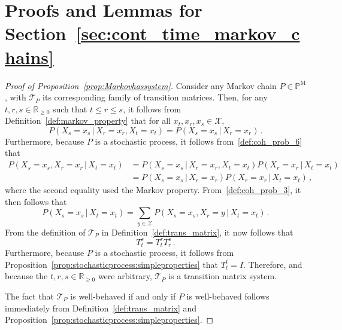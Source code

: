 \documentclass[10pt]{paper}
\theoremstyle{definition}
\newcommand{\reals}{\mathbb{R}}
\newcommand{\realsnonneg}{\reals_{\geq 0}}
\newcommand{\states}{\mathcal{X}}
\newcommand{\processes}{\mathbb{P}}
\newcommand{\mprocesses}{\processes^{\mathrm{M}}}
\begin{document}
\section{Proofs and Lemmas for Section~\ref{sec:cont_time_markov_chains}}

\begin{proof}[Proof of Proposition~\ref{prop:Markovhassystem}]
Consider any Markov chain $P\in\mprocesses$, with $\mathcal{T}_P$ its corresponding family of transition matrices. Then, for any $t,r,s\in\realsnonneg$ such that $t\leq r\leq s$, it follows from Definition~\ref{def:markov_property} that for all $x_t,x_r,x_s\in\states$,
\begin{equation*}
P(X_s=x_s\,\vert\,X_r=x_r,X_t=x_t) = P(X_s=x_s\,\vert\,X_r=x_r)\,.
\end{equation*}
Furthermore, because $P$ is a stochastic process, it follows from~\ref{def:coh_prob_6} that
\begin{align*}
P(X_s=x_s,X_r=x_r\,\vert\,X_t=x_t) &= P(X_s=x_s\,\vert\,X_r=x_r,X_t=x_t)P(X_r=x_r\,\vert\,X_t=x_t) \\
 &= P(X_s=x_s\,\vert\,X_r=x_r)P(X_r=x_r\,\vert\,X_t=x_t)\,,
\end{align*}
where the second equality used the Markov property. From~\ref{def:coh_prob_3}, it then follows that
\begin{equation*}
P(X_s=x_s\,\vert\,X_t=x_t) = \sum_{y\in\states} P(X_s=x_s,X_r=y\,\vert\,X_t=x_t)\,.
\end{equation*}
From the definition of $\mathcal{T}_P$ in Definition~\ref{def:trans_matrix}, it now follows that
\begin{equation*}
T_t^s = T_t^rT_r^s\,.
\end{equation*}
Furthermore, because $P$ is a stochastic process, it follows from Proposition~\ref{prop:stochasticprocess:simpleproperties} that $T_t^t=I$. Therefore, and because the $t,r,s\in\realsnonneg$ were arbitrary, $\mathcal{T}_P$ is a transition matrix system.

The fact that $\mathcal{T}_P$ is well-behaved if and only if $P$ is well-behaved follows immediately from Definition~\ref{def:trans_matrix} and Proposition~\ref{prop:stochasticprocess:simpleproperties}.
\end{proof}
\end{document}
